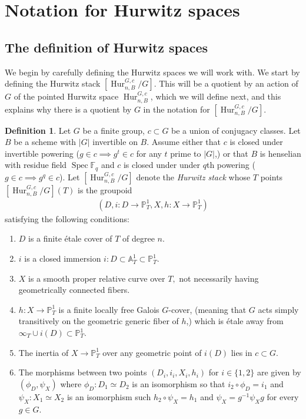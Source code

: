 \documentclass[12 pt]{amsart}
\theoremstyle{plain}
\theoremstyle{definition}
\newtheorem{definition}[theorem]{Definition}
\theoremstyle{remark}
\numberwithin{equation}{section}
\DeclareMathOperator\spec{Spec}
\newcommand{\hur}[4]{[\operatorname{Hur}^{#1, #3}_{#2,#4}/#1]}
\newcommand{\phur}[4]{\operatorname{Hur}^{#1, #3}_{#2,#4}}
\begin{document}
\section{Notation for Hurwitz spaces}
\label{section:hurwitz-space-notation}

\subsection{The definition of Hurwitz spaces}
\label{subsection:hurwitz-definition}


We begin by carefully defining the Hurwitz spaces we will work with. We start
by defining the Hurwitz stack
$\hur G n c B$.
This will be a quotient by an action of $G$ of the pointed Hurwitz space
$\phur G n c B$, which we will define next, and this explains why there is a
quotient by $G$ in the notation for 
$\hur G n c B$.

\begin{definition}
	\label{definition:hurwitz-stacks}
	Let $G$ be a finite group, $c\subset G$ be a union of conjugacy classes.
	Let $B$ be a scheme with $|G|$ invertible on $B$.
	Assume either that $c$ is closed under invertible powering ($g \in c
		\implies g^t
	\in c$ for any $t$ prime to $|G|$,) or that $B$ is henselian with residue
	field $\spec \mathbb F_q$ and
	$c$ is closed under under $q$th powering ($g \in c \implies g^q \in c$).
	Let $\hur G n c B$ denote the {\em Hurwitz stack}
	whose $T$ points $\hur G n c B(T)$ is the groupoid
	\begin{align*}
		\left( D, i: D \to \mathbb P^1_T, X, h: X \to \mathbb P^1_T  \right)
	\end{align*}
		satisfying the following conditions:
		\begin{enumerate}
			\item $D$ is a finite \'etale cover of $T$ of degree $n$.
	        \item $i$ is a closed immersion $i: D \subset \mathbb A^1_T
			\subset \mathbb P^1_T$.
		\item $X$ is a smooth proper relative curve over $T,$ not
		necessarily having geometrically
		connected fibers.
		\item $h: X \to \mathbb P^1_T$ is a finite locally free Galois $G$-cover,
			(meaning that $G$ acts simply transitively on the
			geometric generic fiber of $h$,) which is
			\'etale away from $\infty_T \cup i(D) \subset \mathbb
			P^1_T$.
		\item The inertia of $X \to \mathbb P^1_T$ over any geometric
			point of $i(D)$ lies in $c \subset
			G$.
	\item The morphisms between two points $(D_i, i_i, X_i, h_i)$ for $i \in
		\{1,2\}$ are given by $(\phi_D, \psi_X)$ where $\phi_D: D_1
		\simeq D_2$ is an isomorphism so that $i_2 \circ \phi_D = i_1$
		and $\psi_X:X_1 \simeq X_2$ is an isomorphism such $h_2 \circ
		\psi_X = h_1$ and $\psi_X
		= g^{-1} \psi_X g$ for every $g \in G$.
	\end{enumerate}
\end{definition}
\end{document}
